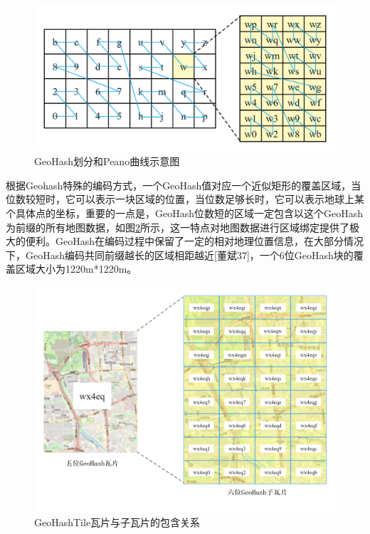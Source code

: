 \begin{figure}
  \centering
  \includegraphics[width=1.0\textwidth]{figures/peano}
  \caption{GeoHash划分和Peano曲线示意图}\label{fig:peano}
\end{figure}


根据Geohash特殊的编码方式，一个GeoHash值对应一个近似矩形的覆盖区域，当位数较短时，它可以表示一块区域的位置，当位数足够长时，它可以表示地球上某个具体点的坐标，重要的一点是，GeoHash位数短的区域一定包含以这个GeoHash为前缀的所有地图数据，如图\ref{fig:fatherAndSon}所示，这一特点对地图数据进行区域绑定提供了极大的便利。GeoHash在编码过程中保留了一定的相对地理位置信息，在大部分情况下，GeoHash编码共同前缀越长的区域相距越近[董斌37]，一个6位GeoHash块的覆盖区域大小为1220m*1220m。

\begin{figure}
  \centering
  \includegraphics[width=1.0\textwidth]{figures/瓦片与子瓦片}
  \caption{GeoHashTile瓦片与子瓦片的包含关系}\label{fig:fatherAndSon}
\end{figure}


